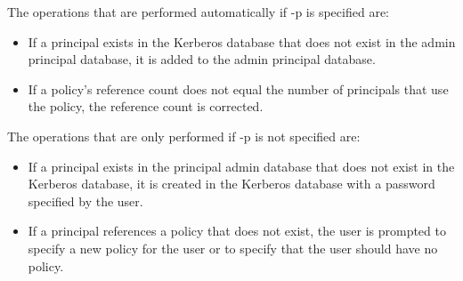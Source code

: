 The operations that are performed automatically if -p is specified
are:

\begin{itemize}
\item  If a principal exists in the Kerberos database that
does not exist in the admin principal database, it is added to the
admin principal database.

\item  If a policy's reference count does not equal the
number of principals that use the policy, the reference count is
corrected.
\end{itemize}

The operations that are only performed if -p is not specified are:

\begin{itemize}
\item If a principal exists in the principal admin
database that does not exist in the Kerberos database, it is created
in the Kerberos database with a password specified by the user.

\item If a principal references a policy that does not exist, the user
is prompted to specify a new policy for the user or to specify that
the user should have no policy.
\end{itemize}


